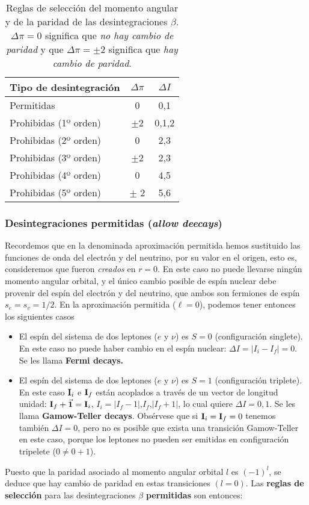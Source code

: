 \begin{table}[h!]\centering
	\begin{tabular}{|l||c|c|}\hline
		Tipo de desintegración & $\Delta \pi$ & $\Delta I$ \\ \hline \hline
		Permitidas & 0 & 0,1 \\ \hline 
		Prohibidas (1º orden) & $\pm$2 & 0,1,2 \\ \hline
		Prohibidas (2º orden) & 0 & 2,3 \\ 	\hline	
		Prohibidas (3º orden) & $\pm$2 & 2,3 \\ \hline	
		Prohibidas (4º orden) & 0 & 4,5 \\ 	\hline	
		Prohibidas (5º orden) & $\pm$ 2 & 5,6  \\		 \hline
	\end{tabular}
	\caption{Reglas de selección del momento angular y de la paridad de las desintegraciones $\beta$. $\Delta \pi=0$ significa que \textit{no hay cambio de paridad} y que $\Delta \pi=\pm2$ significa que \textit{hay cambio de paridad}.}
	\label{Tab:02-02-01}
\end{table}




\subsubsection{Desintegraciones permitidas (\textit{allow deecays})}


Recordemos que en la denominada aproximación permitida hemos sustituido las funciones de onda del electrón y del neutrino, por su valor en el origen, esto es, consideremos que fueron \textit{creados} en $r=0$. En este caso no puede llevarse ningún momento angular orbital, y el único cambio posible de espín nuclear debe provenir del espín del electrón y del neutrino, que ambos son fermiones de espín $s_e=s_v=1/2$. En la aproximación permitida ($\ell=0$), podemos tener entonces los siguientes casos

\begin{itemize}
	\item El espín del sistema de dos leptones ($e$ y $\nu$) es $S=0$ (configuración singlete). En este caso no puede haber cambio en el espín nuclear: $\Delta I=|I_i-I_f|=0$. Se les llama \textbf{Fermi decays.}
	\item El espín del sistema de dos leptones ($e$ y $\nu$) es $S=1$ (configuración triplete). En este caso $\mathbf{I}_i$ e $\mathbf{I}_f$ están acoplados a través de un vector de longitud unidad: $\mathbf{I}_f + \vec{\mathbf{1}} = \mathbf{I}_i$, $I_i=|I_f-1|$,$I_f$,$|I_f+1|$, lo cual quiere $\Delta I = 0,1$. Se les llama \textbf{Gamow-Teller decays}. Obsérvese que si $\mathbf{I}_i=\mathbf{I}_f=0$ tenemos también $\Delta I=0$, pero no es posible que exista una transición Gamow-Teller en este caso, porque los leptones no pueden ser emitidas en configuración tripelete ($0\neq 0+1$).
\end{itemize}
Puesto que la paridad asociado al momento angular orbital $l$ es $(-1)^l$, se deduce que hay cambio de paridad en estas transiciones $(l=0)$. Las \textbf{reglas de selección} para las desintegraciones $\beta$ \textbf{permitidas} son entonces:

